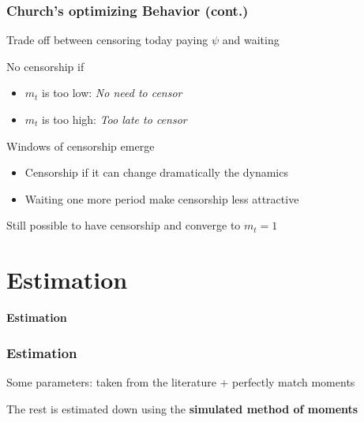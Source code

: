 \documentclass[aspectratio=169,red,12pt]{beamer}
\begin{document}
\begin{frame}
	\frametitle{Church's optimizing Behavior (cont.)}
	Trade off between censoring today paying $\psi$ and waiting\vspace{0.3cm}
	
	No censorship if 
	\begin{itemize}
		\item $m_t$ is too low: \textit{No need to censor}
		\item $m_t$ is too high: \textit{Too late to censor} \vspace{0.3cm}
	\end{itemize}

    Windows of censorship emerge
    	\begin{itemize}
    	\item Censorship if it can change dramatically the dynamics
    	\item Waiting one more period make censorship less attractive\vspace{0.3cm}
    \end{itemize}

   Still possible to have censorship and converge to $m_t=1$\vspace{0.3cm}
   
   
\end{frame}


\section{Estimation}

\begin{frame}{}
	\centering \Huge
	{\color{structure}\textbf{Estimation}}
\end{frame}
\begin{frame}
	\frametitle{Estimation}
	 
 Some parameters: taken from the literature + perfectly match moments\vspace{0.2cm}
 
 The rest is estimated down using the \textbf{simulated method of moments}
 \scriptsize
  
\end{frame}
\end{document}
